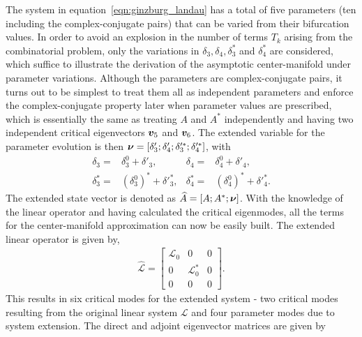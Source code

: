 The system in equation~\eqref{eqn:ginzburg_landau} has a total of five parameters (ten including the complex-conjugate pairs) that can be varied from their bifurcation values. In order to avoid an explosion in the number of terms $T_{k}$ arising from the combinatorial problem, only the variations in $\delta_{3},\delta_{4},\delta^{*}_{3}$ and $\delta^{*}_{4}$ are considered, which suffice to illustrate the derivation of the asymptotic center-manifold under parameter variations. Although the parameters are complex-conjugate pairs, it turns out to be simplest to treat them all as independent parameters and enforce the complex-conjugate property later when parameter values are prescribed, which is essentially the same as treating $A$ and $A^{*}$ independently and having two independent critical eigenvectors $\boldsymbol{v}_{5}$ and $\boldsymbol{v}_{6}$. 
The extended variable for the parameter evolution is then $\boldsymbol{\nu} = [\delta'_{3};\delta'_{4};\delta'^{*}_{3};\delta'^{*}_{4}]$, with 
\begin{align}
	\delta_{3} =& \delta^{0}_{3} + \delta'_{3},& \delta_{4} =& \delta^{0}_{4} + \delta'_{4}, \nonumber \\
	\delta^{*}_{3} =& (\delta^{0}_{3})^{*} + \delta'^{*}_{3}, &\delta^{*}_{4} =& (\delta^{0}_{4})^{*} + \delta'^{*}_{4}. \nonumber
\end{align}
The extended state vector is denoted as $\widehat{A} = [A; A^{*}; \boldsymbol{\nu}]$. With the knowledge of the linear operator and having calculated the critical eigenmodes, all the terms for the center-manifold approximation can now be easily built. 
The extended linear operator is given by,
 \begin{align}
 	\mathcal{\widehat{L}} = \begin{bmatrix}
 		\mathcal{L}_{0} 	   & 0											&	0 \\
 		0									  & \mathcal{L}^{*}_{0}		&   0 \\
 		0									  & 0											&  0
 	\end{bmatrix}. \nonumber
 \end{align}
This results in six critical modes for the extended system - two critical modes resulting from the original linear system $\mathcal{L}$ and four parameter modes due to system extension. The direct and adjoint eigenvector matrices are given by
